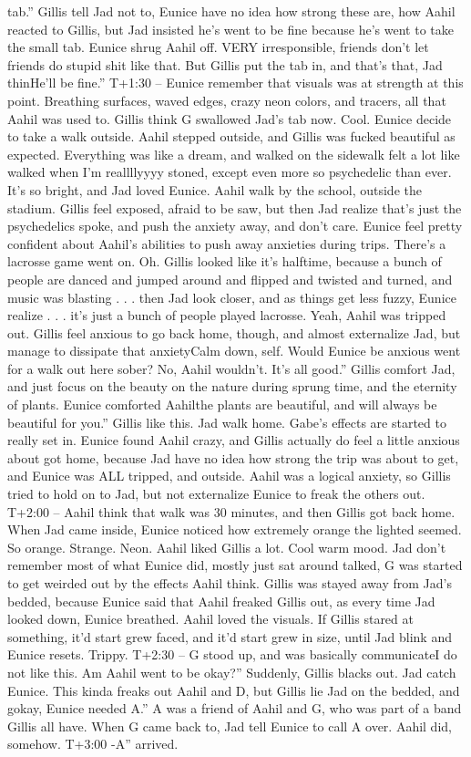 \documentclass[12pt]{book}
\begin{document}
tab.'' Gillis tell Jad not to, Eunice have no idea how strong these are, how Aahil reacted to Gillis, but Jad insisted he's went to be fine because he's went to take the small tab. Eunice shrug Aahil off. VERY irresponsible, friends don't let friends do stupid shit like that. But Gillis put the tab in, and that's that, Jad thinHe'll be fine.'' T+1:30 -- Eunice remember that visuals was at  strength at this point. Breathing surfaces, waved edges, crazy neon colors, and tracers, all that Aahil was used to. Gillis think G swallowed Jad's tab now. Cool. Eunice decide to take a walk outside. Aahil stepped outside, and Gillis was fucked beautiful as expected. Everything was like a dream, and walked on the sidewalk felt a lot like walked when I'm reallllyyyy stoned, except even more so psychedelic than ever. It's so bright, and Jad loved Eunice. Aahil walk by the school, outside the stadium. Gillis feel exposed, afraid to be saw, but then Jad realize that's just the psychedelics spoke, and push the anxiety away, and don't care. Eunice feel pretty confident about Aahil's abilities to push away anxieties during trips. There's a lacrosse game went on. Oh. Gillis looked like it's halftime, because a bunch of people are danced and jumped around and flipped and twisted and turned, and music was blasting . . .  then Jad look closer, and as things get less fuzzy, Eunice realize . . .  it's just a bunch of people played lacrosse. Yeah, Aahil was tripped out. Gillis feel anxious to go back home, though, and almost externalize Jad, but manage to dissipate that anxietyCalm down, self. Would Eunice be anxious went for a walk out here sober? No, Aahil wouldn't. It's all good.'' Gillis comfort Jad, and just focus on the beauty on the nature during sprung time, and the eternity of plants. Eunice comforted Aahilthe plants are beautiful, and will always be beautiful for you.'' Gillis like this. Jad walk home. Gabe's effects are started to really set in. Eunice found Aahil crazy, and Gillis actually do feel a little anxious about got home, because Jad have no idea how strong the trip was about to get, and Eunice was ALL tripped, and outside. Aahil was a logical anxiety, so Gillis tried to hold on to Jad, but not externalize Eunice to freak the others out. T+2:00 -- Aahil think that walk was 30 minutes, and then Gillis got back home. When Jad came inside, Eunice noticed how extremely orange the lighted seemed. So orange. Strange. Neon. Aahil liked Gillis a lot. Cool warm mood. Jad don't remember most of what Eunice did, mostly just sat around talked, G was started to get weirded out by the effects Aahil think. Gillis was stayed away from Jad's bedded, because Eunice said that Aahil freaked Gillis out, as every time Jad looked down, Eunice breathed. Aahil loved the visuals. If Gillis stared at something, it'd start grew faced, and it'd start grew in size, until Jad blink and Eunice resets. Trippy. T+2:30 -- G stood up, and was basically communicateI do not like this. Am Aahil went to be okay?'' Suddenly, Gillis blacks out. Jad catch Eunice. This kinda freaks out Aahil and D, but Gillis lie Jad on the bedded, and gokay, Eunice needed A.'' A was a friend of Aahil and G, who was part of a band Gillis all have. When G came back to, Jad tell Eunice to call A over. Aahil did, somehow. T+3:00 -A'' arrived. 
\end{document}
